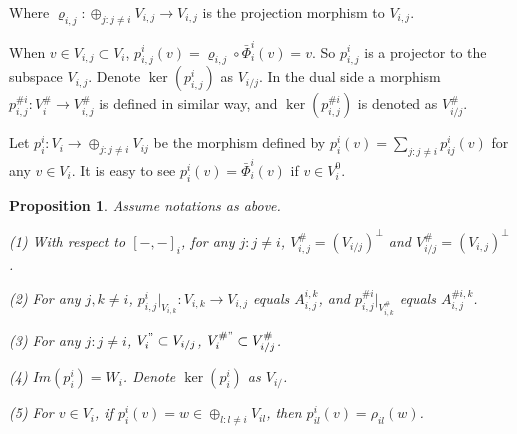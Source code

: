 \def\CTEXPreproc{Created by ctex v0.2.12, don't edit!}\documentclass[11pt]{article}
\newtheorem{prop}{Proposition}[section]
\begin{document}
  Where $\varrho_{i,j} : \oplus_{j:j\neq i  } V_{i,j} \rightarrow V_{i,j}  $ is  the projection morphism  to $ V_{i,j} $.



  When $v\in V_{i,j} \subset V_i $, $p^i _{i,j} (v) =  \varrho _{i,j} \circ \bar{\Phi}^i _i  (v)= v$. So $p^i _{i,j}$ is a projector to the subspace $V_{i,j}$. Denote $\ker( p^i _{i,j} )$ as $ V_{i/j} $. In the dual side a morphism
  $p^{\# i}_{i,j}: V^{\# } _i \rightarrow V^{\#} _{i,j} $ is defined in similar way, and $\ker( p^{\# i}_{i,j} )$ is denoted as $V^{\#}_{i/j} $.

  Let  $p^i _i : V_i \rightarrow \oplus_{j:j\neq i} V_{ij} $ be the morphism defined by
   $p^i _i (v) = \sum_{j: j\neq i} p^i _{ij}(v) $ for any $v\in V_i $. It is easy to see $p^i _i (v)= \bar{\Phi}^i _i (v)$ if $v\in V^0 _i$.

  \begin{prop} Assume notations as above.

  \noindent (1) With respect to  $[-,- ]_i $, for any $j:j\neq i$, $V^{\#}_{i,j}= (  V_{i/j} )^{\perp} $  and $ V^{\# }_{i/j} = (  V_{i,j} )^{\perp}  $.

 \noindent (2) For any $j,k\neq i $,  $p^i _{i,j} |_{ V_{i,k} } : V_{i,k} \rightarrow V_{i,j} $ equals $A^{i,k} _{i,j} $, and
  $ p^{\# i} _{i,j} |_{ V^{\#}_{i,k}  }$ equals $ A^{\# i,k } _{i,j}   $.

  \noindent (3) For any $j: j\neq i$, $V^{"} _i \subset V_{i/j}$, $V^{\# "} _i \subset V^{\# } _{i/j}$.

  \noindent(4) $Im(p^i _i ) = W_i $. Denote $\ker( p^i _i ) $ as $V_{i/}$.

  \noindent (5) For $v\in V_i$, if $p^i _i (v)= w\in \oplus_{l:l\neq i} V_{il}$, then $p^i _{il}(v)= \rho_{il}(w)$.

  \end{prop}
\end{document}
